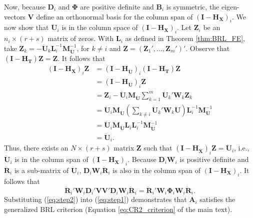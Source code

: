 \documentclass[12pt]{article}
\begin{document}
Now, because \(\mathbf{D}_i\) and \(\boldsymbol\Phi\) are positive
definite and \(\mathbf{B}_i\) is symmetric, the eigen-vectors
\(\mathbf{V}\) define an orthonormal basis for the column span of
\(\left(\mathbf{I} - \mathbf{H_X}\right)_i\). We now show that
\(\mathbf{\ddot{U}}_i\) is in the column space of
\(\left(\mathbf{I} - \mathbf{H_X}\right)_i\). Let \(\mathbf{Z}_i\) be an
\(n_i \times (r + s)\) matrix of zeros. With \(\mathbf{L}_i\) as defined
in Theorem \ref{thm:BRL_FE}, take
\(\mathbf{Z}_k = - \mathbf{\ddot{U}}_k \mathbf{L}_i^{-1}\mathbf{M}_{\mathbf{\ddot{U}}}^{-1}\),
for \(k \neq i\) and
\(\mathbf{Z} = \left(\mathbf{Z}_1',...,\mathbf{Z}_m'\right)'\). Observe
that \(\left(\mathbf{I} - \mathbf{H_T}\right) \mathbf{Z} = \mathbf{Z}\).
It follows that \begin{align*}
\left(\mathbf{I} - \mathbf{H_X}\right)_i \mathbf{Z} &= \left(\mathbf{I} - \mathbf{H_{\ddot{U}}}\right)_i \left(\mathbf{I} - \mathbf{H_T}\right) \mathbf{Z} \\
&= \left(\mathbf{I} - \mathbf{H_{\ddot{U}}}\right)_i \mathbf{Z} \\
&= \mathbf{Z}_i - \mathbf{\ddot{U}}_i\mathbf{M_{\ddot{U}}}\sum_{k=1}^m \mathbf{\ddot{U}}_k'\mathbf{W}_k\mathbf{Z}_k \\
&= \mathbf{\ddot{U}}_i\mathbf{M_{\ddot{U}}} \left(\sum_{k \neq i} \mathbf{\ddot{U}}_k' \mathbf{W}_k \mathbf{\ddot{U}} \right) \mathbf{L}_i^{-1}\mathbf{M}_{\mathbf{\ddot{U}}}^{-1} \\
&= \mathbf{\ddot{U}}_i\mathbf{M_{\ddot{U}}} \mathbf{L}_i \mathbf{L}_i^{-1} \mathbf{M}_{\mathbf{\ddot{U}}}^{-1} \\
&= \mathbf{\ddot{U}}_i.
\end{align*} Thus, there exists an \(N \times (r + s)\) matrix
\(\mathbf{Z}\) such that
\(\left(\mathbf{I} - \mathbf{H_{\ddot{X}}}\right)_i \mathbf{Z} = \mathbf{\ddot{U}}_i\),
i.e., \(\mathbf{\ddot{U}}_i\) is in the column span of
\(\left(\mathbf{I} - \mathbf{H_X}\right)_i\). Because
\(\mathbf{D}_i \mathbf{W}_i\) is positive definite and
\(\mathbf{\ddot{R}}_i\) is a sub-matrix of \(\mathbf{\ddot{U}}_i\),
\(\mathbf{D}_i\mathbf{W}_i\mathbf{\ddot{R}}_i\) is also in the column
span of \(\left(\mathbf{I} - \mathbf{H_X}\right)_i\). It follows that
\begin{equation}
\label{eq:step2}
\mathbf{\ddot{R}}_i' \mathbf{W}_i \mathbf{D}_i' \mathbf{V}\mathbf{V}' \mathbf{D}_i \mathbf{W}_i \mathbf{\ddot{R}}_i = \mathbf{\ddot{R}}_i' \mathbf{W}_i \boldsymbol\Phi_i \mathbf{W}_i \mathbf{\ddot{R}}_i.
\end{equation} Substituting (\ref{eq:step2}) into (\ref{eq:step1})
demonstrates that \(\mathbf{A}_i\) satisfies the generalized BRL
criterion (Equation \ref{eq:CR2_criterion} of the main text).
\end{document}
